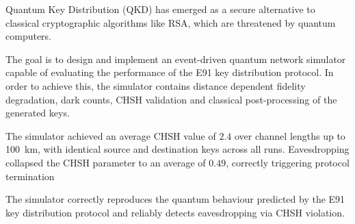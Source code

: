 Quantum Key Distribution (QKD) has emerged as a secure alternative to classical cryptographic algorithms like RSA, which are threatened by quantum computers. 

The goal is to design and implement an event-driven quantum network simulator capable of evaluating the performance of the E91 key distribution protocol. In order to achieve this, the simulator contains distance dependent fidelity degradation, dark counts, CHSH validation and classical post-processing of the generated keys.

The simulator achieved an average CHSH value of $2.4$ over channel lengths up to 100~km, with identical source and destination keys across all runs. Eavesdropping collapsed the CHSH parameter to an average of $0.49$, correctly triggering protocol termination

The simulator correctly reproduces the quantum behaviour predicted by the E91 key distribution protocol and reliably detects eavesdropping via CHSH violation.
